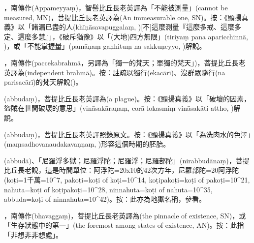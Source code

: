 \startitemgroup[noteitems]
\item{}，南傳作(Appameyyaṃ)，智髻比丘長老英譯為「不能被測量」(cannot be measured, MN)，菩提比丘長老英譯為(An immeasurable one, SN)。按：《顯揚真義》以「諸漏已盡的人(khīṇāsavapuggalaṃ, )[不]這麼測量『這麼多戒、這麼多定、這麼多慧』」，《破斥猶豫》以「(大地)四方無限」(tiriyaṃ pana aparicchinnā, )，或「不能掌握量」(pamāṇaṃ gaṇhituṃ na sakkuṇeyyo, )解說。
\stopitemgroup

\startitemgroup[noteitems]
\item{}，南傳作(paccekabrahmā，另譯為「獨一的梵天；單獨的梵天」)，菩提比丘長老英譯為(independent brahmā)。按：註疏以獨行(ekacārī)、沒群眾隨行(na parisacārī)的梵天解說()。
\stopitemgroup

\startitemgroup[noteitems]
\item{}(abbudaṃ)，菩提比丘長老英譯為(a plague)。按：《顯揚真義》以「破壞的因素，盜賊在世間破壞的意思」(vināsakāraṇaṃ, corā lokasmiṃ vināsakāti attho, )解說。
\item{}(abbudaṃ)，菩提比丘長老英譯照錄原文。按：《顯揚真義》以「為洗肉水的色澤」(maṃsadhovanaudakavaṇṇaṃ, )形容這個時期的胚胎。
\item{}(abbudā)、「尼羅浮多獄；尼羅浮陀；尼羅浮；尼羅部陀」(nirabbudānaṃ)，菩提比丘長老說，這是時間單位：阿浮陀=20x10的42次方年，尼羅部陀=20阿浮陀(koṭi=1千萬=10^7, pakoṭi=koṭi of koṭi=10^14, koṭipakoṭi=koṭi of pakoṭi=10^21, nahuta=koṭi of koṭipakoṭi=10^28, ninnahuta=koṭi of nahuta=10^35, abbuda=koṭi of ninnahuta=10^42)。按：此亦為地獄名稱，參看。
\stopitemgroup

\startitemgroup[noteitems]
\item{}，南傳作(bhavaggaṃ)，菩提比丘長老英譯為(the pinnacle of existence, SN)，或「生存狀態中的第一」(the foremost among states of existence, AN)。按：此指「非想非非想處」。
\stopitemgroup

